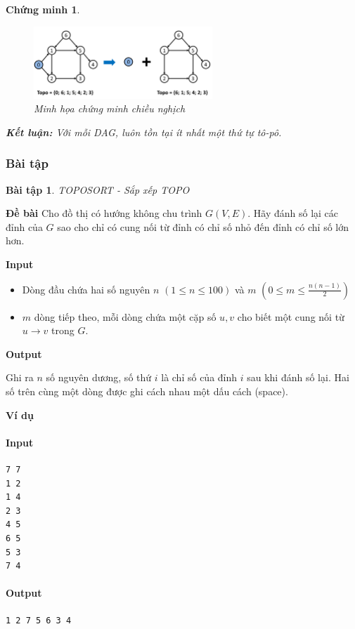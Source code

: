 \documentclass{article}
\newtheorem{chungminh}{Chứng minh}
\newtheorem{baitap}{Bài tập}
\begin{document}
\begin{chungminh}
\begin{figure}[H]
    \centering
    \includegraphics[width=0.6\textwidth]{img/b2/topological_sort_img2.png}
    \caption{Minh họa chứng minh chiều nghịch}
\end{figure}
\textbf{Kết luận:} Với mỗi DAG, luôn tồn tại ít nhất một thứ tự tô-pô.
\end{chungminh}

\subsubsection{Bài tập}
\begin{baitap}
    TOPOSORT - Sắp xếp TOPO
\end{baitap}

\textbf{Đề bài}
Cho đồ thị có hướng không chu trình $G(V, E)$. Hãy đánh số lại các đỉnh của $G$ sao cho chỉ có cung nối từ đỉnh có chỉ số nhỏ đến đỉnh có chỉ số lớn hơn.

\textbf{Input}

\begin{itemize}
    \item Dòng đầu chứa hai số nguyên $n$ $(1 \leq n \leq 100)$ và $m$ $(0 \leq m \leq \frac{n(n-1)}{2})$
    \item $m$ dòng tiếp theo, mỗi dòng chứa một cặp số $u, v$ cho biết một cung nối từ $u \rightarrow v$ trong $G$.
\end{itemize}

\textbf{Output}

Ghi ra $n$ số nguyên dương, số thứ $i$ là chỉ số của đỉnh $i$ sau khi đánh số lại. Hai số trên cùng một dòng được ghi cách nhau một dấu cách (space).

\textbf{Ví dụ}

\paragraph{Input}
\begin{lstlisting}
7 7
1 2
1 4
2 3
4 5
6 5
5 3
7 4 
\end{lstlisting}

\paragraph{Output}
\begin{lstlisting}
1 2 7 5 6 3 4
\end{lstlisting}
\end{document}
